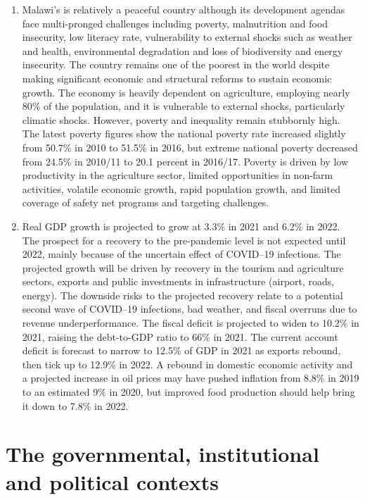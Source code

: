 \documentclass[
]{book}
\begin{document}
\begin{enumerate}
\def\labelenumi{\arabic{enumi}.}
\setcounter{enumi}{20}
\item
  Malawi's is relatively a peaceful country although its development agendas face multi-pronged challenges including poverty, malnutrition and food insecurity, low literacy rate, vulnerability to external shocks such as weather and health, environmental degradation and loss of biodiversity and energy insecurity. The country remains one of the poorest in the world despite making significant economic and structural reforms to sustain economic growth. The economy is heavily dependent on agriculture, employing nearly 80\% of the population, and it is vulnerable to external shocks, particularly climatic shocks. However, poverty and inequality remain stubbornly high. The latest poverty figures show the national poverty rate increased slightly from 50.7\% in 2010 to 51.5\% in 2016, but extreme national poverty decreased from 24.5\% in 2010/11 to 20.1 percent in 2016/17. Poverty is driven by low productivity in the agriculture sector, limited opportunities in non-farm activities, volatile economic growth, rapid population growth, and limited coverage of safety net programs and targeting challenges.
\item
  Real GDP growth is projected to grow at 3.3\% in 2021 and 6.2\% in 2022. The prospect for a recovery to the pre-pandemic level is not expected until 2022, mainly because of the uncertain effect of COVID--19 infections. The projected growth will be driven by recovery in the tourism and agriculture sectors, exports and public investments in infrastructure (airport, roads, energy). The downside risks to the projected recovery relate to a potential second wave of COVID--19 infections, bad weather, and fiscal overruns due to revenue underperformance. The fiscal deficit is projected to widen to 10.2\% in 2021, raising the debt-to-GDP ratio to 66\% in 2021. The current account deficit is forecast to narrow to 12.5\% of GDP in 2021 as exports rebound, then tick up to 12.9\% in 2022. A rebound in domestic economic activity and a projected increase in oil prices may have pushed inflation from 8.8\% in 2019 to an estimated 9\% in 2020, but improved food production should help bring it down to 7.8\% in 2022.
\end{enumerate}

\hypertarget{the-governmental-institutional-and-political-contexts}{%
\section{The governmental, institutional and political contexts}\label{the-governmental-institutional-and-political-contexts}}
\end{document}
